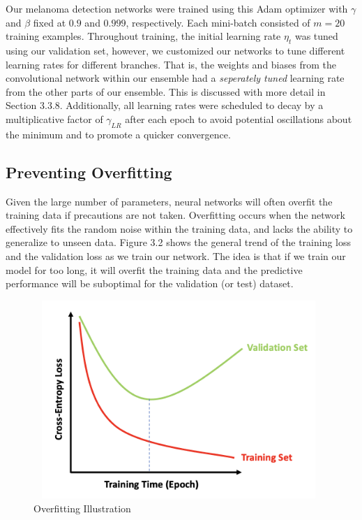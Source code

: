 \documentclass [MAS] {uclathes}
\begin{document}
Our melanoma detection networks were trained using this Adam optimizer with $\gamma$ and $\beta$ fixed at $0.9$ and $0.999$, respectively. Each mini-batch consisted of $m=20$ training examples.  Throughout training, the initial learning rate $\eta_t$ was tuned using our validation set, however, we customized our networks to tune different learning rates for different branches. That is, the weights and biases from the convolutional network within our ensemble had a \textit{seperately tuned} learning rate from the other parts of our ensemble. This is discussed with more detail in Section 3.3.8. Additionally, all learning rates were scheduled to decay by a multiplicative factor of $\gamma_{LR}$ after each epoch to avoid potential oscillations about the minimum and to promote a quicker convergence.

\subsection{Preventing Overfitting}

Given the large number of parameters, neural networks will often overfit the training data if precautions are not taken. Overfitting occurs when the network effectively fits the random noise within the training data, and lacks the ability to generalize to unseen data. Figure 3.2 shows the general trend of the training loss and the validation loss as we train our network. The idea is that if we train our model for too long, it will overfit the training data and the predictive performance will be suboptimal for the validation (or test) dataset. 

\begin{figure}[h]
\centering
\includegraphics[height = 75mm, width=110mm]{imgs/overfitting.png}
\caption{Overfitting Illustration}
\label{fig:ovfit}
\end{figure}
\end{document}

